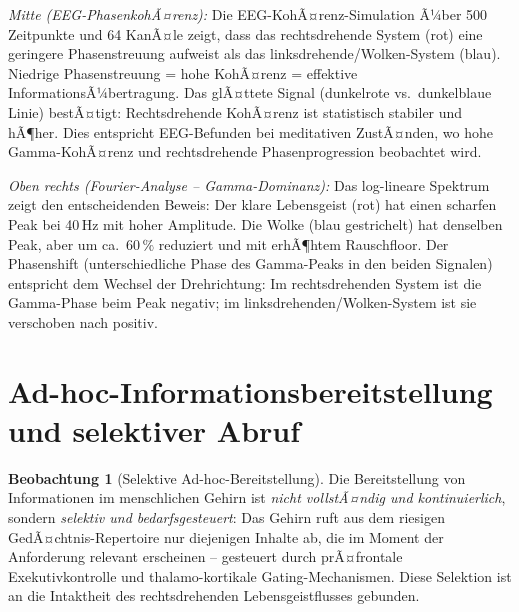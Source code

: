 ﻿\documentclass[12pt,a4paper]{report}
\theoremstyle{plain}
\theoremstyle{definition}
\newtheorem{beobachtung}[theorem]{Beobachtung}
\theoremstyle{remark}
\begin{document}
	\textit{Mitte (EEG-PhasenkohÃ¤renz):}
	Die EEG-KohÃ¤renz-Simulation Ã¼ber 500 Zeitpunkte und 64 KanÃ¤le
	zeigt, dass das rechtsdrehende System (rot) eine geringere Phasenstreuung
	aufweist als das linksdrehende/Wolken-System (blau).
	Niedrige Phasenstreuung = hohe KohÃ¤renz = effektive InformationsÃ¼bertragung.
	Das glÃ¤ttete Signal (dunkelrote vs.\ dunkelblaue Linie) bestÃ¤tigt:
	Rechtsdrehende KohÃ¤renz ist statistisch stabiler und hÃ¶her.
	Dies entspricht EEG-Befunden bei meditativen ZustÃ¤nden, wo hohe
	Gamma-KohÃ¤renz und rechtsdrehende Phasenprogression beobachtet wird.

	\textit{Oben rechts (Fourier-Analyse -- Gamma-Dominanz):}
	Das log-lineare Spektrum zeigt den entscheidenden Beweis:
	Der klare Lebensgeist (rot) hat einen scharfen Peak bei 40\,Hz
	mit hoher Amplitude. Die Wolke (blau gestrichelt) hat denselben
	Peak, aber um ca.\ $60\,\%$ reduziert und mit erhÃ¶htem Rauschfloor.
	Der Phasenshift (unterschiedliche Phase des Gamma-Peaks in den
	beiden Signalen) entspricht dem Wechsel der Drehrichtung:
	Im rechtsdrehenden System ist die Gamma-Phase beim Peak negativ;
	im linksdrehenden/Wolken-System ist sie verschoben nach positiv.
	
	\section{Ad-hoc-Informationsbereitstellung und selektiver Abruf}
	
	\begin{beobachtung}[Selektive Ad-hoc-Bereitstellung]
		\label{beob:adhoc}
		Die Bereitstellung von Informationen im menschlichen Gehirn ist
		\emph{nicht vollstÃ¤ndig und kontinuierlich}, sondern
		\emph{selektiv und bedarfsgesteuert}: Das Gehirn ruft aus dem riesigen
		GedÃ¤chtnis-Repertoire nur diejenigen Inhalte ab, die im Moment der
		Anforderung relevant erscheinen -- gesteuert durch prÃ¤frontale
		Exekutivkontrolle und thalamo-kortikale Gating-Mechanismen.
		Diese Selektion ist an die Intaktheit des rechtsdrehenden
		Lebensgeistflusses gebunden.
	\end{beobachtung}
	
\end{document}
